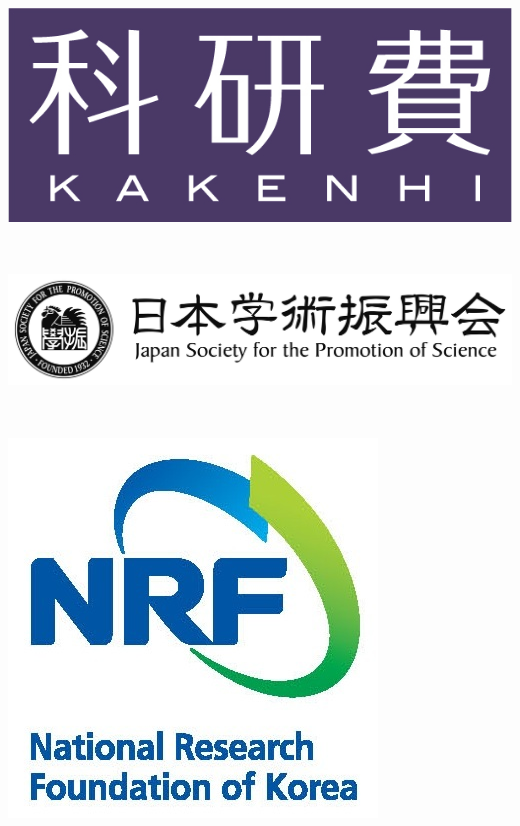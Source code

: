 \documentclass[dvipdfmx,10pt]{beamer}
\begin{document}
{\begin{minipage}{0.3\linewidth}
\centering
\includegraphics[width=0.75\linewidth]{KAKENHIlogo.jpg}
\end{minipage}
\begin{minipage}{0.01\linewidth}
\ \\
\end{minipage}
\begin{minipage}{0.3\linewidth}
\centering
\includegraphics[width=1.1\linewidth]{nihongakuzyutu.jpg}
\end{minipage}
\begin{minipage}{0.01\linewidth}
\ \\
\end{minipage}
\begin{minipage}{0.3\linewidth}
\centering
\includegraphics[width=0.6\linewidth]{logo_nrf.jpg}
\end{minipage}
}

\end{document}
